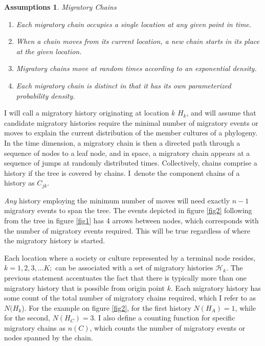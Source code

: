 \documentclass[11pt]{article}
\newtheorem{assumptions}{Assumptions}
\begin{document}
\begin{assumptions}{Migratory Chains}    
\begin{enumerate}
\item Each migratory chain occupies a single location at any given point in time.
\item When a chain moves from its current location, a new chain starts in its place at the given location.
\item Migratory chains move at random times according to an exponential density.
\item Each migratory chain is distinct in that it has its own parameterized probability density.
\end{enumerate}
\end{assumptions}
I will call a migratory history originating at location $k$ $H_k$, and will assume that candidate migratory histories require the minimal number of migratory events or moves to explain the current distribution of the member cultures of a phylogeny. In the time dimension, a migratory chain is then a directed path through a sequence of nodes to a leaf node, and in space, a migratory chain appears at a sequence of jumps at randomly distributed times. Collectively, chains comprise a history if the tree is covered by chains. I\ denote the component chains of a history as $C_{jk}$.

\textit{Any} history employing the minimum number of moves will need exactly $n-1$ migratory events to span the tree. The events depicted in figure \ref{fig2} following from the tree in figure \ref{fig1} has 4 arrows between nodes, which corresponds with the number of migratory events required. This will be true regardless of where the migratory history is started. 

Each location where a society or culture represented by a terminal node resides,  $k=1,2,3,\hdots K;$ can be associated with a set of migratory histories $\mathcal{H}_k$. The previous statement accentuates the fact that there is typically more than one migratory history that is possible from origin point $k$. Each migratory history has some count of the total number of migratory chains required, which I refer to as  $N(H_k$). For the example on figure \ref{fig2}, for the first history $N(H_A)=1$, while for the second, $N(H_C)=3$.    I also define a counting function for specific migratory chains as $n(C)$, which counts the number of migratory events or nodes spanned by the chain. 
\end{document}
